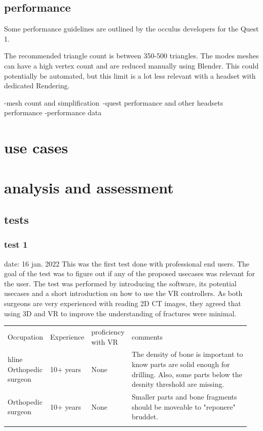 \documentclass[a4paper]{report}
\begin{document}
\section{performance}
Some performance guidelines are outlined by the occulus developers for the Quest 1\cite{performance}.

The recommended triangle count is between 350-500 triangles. The modes meshes can have a high vertex count and are reduced manually using Blender. This could potentially be automated, but this limit is a lot less relevant with a headset with dedicated Rendering.


-mesh count and simplification\
-quest performance and other headsets performance
-performance data

\chapter{use cases}\label{usecases}

\chapter{analysis and assessment}\label{analysis and assessment}

\section{tests}


\subsection{test 1}
date: 16 jan. 2022
This was the first test done with professional end users. The goal of the test was to figure out if any of the proposed usecases was relevant for the user. The test was performed by introducing the software, its potential usecases and a short introduction on how to use the VR controllers.
As both surgeons are very experienced with reading 2D CT images, they agreed that using 3D and VR to improve the understanding of fractures were minimal.

\begin{table}[ht]
\begin{tabular}{p{0.15\linewidth} |p{0.15\linewidth} |p{0.15\linewidth} | p{0.5\linewidth}}
Occupation         & Experience & proficiency with VR & comments                                                                                                                                \\hline
Orthopedic surgeon & 10+ years  & None                & The density of bone is important to know parts are solid enough for drilling. Also, some parts below the desnity threshold are missing. \\
Orthopedic surgeon & 10+ years  & None                & Smaller parts and bone fragments should be moveable to "reponere" bruddet.                                                              \\
                   &            &                     &
\end{tabular}
\end{table}
\end{document}
